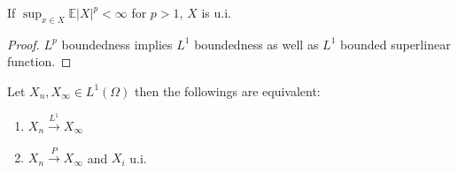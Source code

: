 \begin{corollary}
	If  $\sup_{x \in X} \mathbb{E}|X|^p < \infty$ for $p > 1$, $X$ is u.i.
\end{corollary}
\begin{proof}
	$L^p$ boundedness implies $L^1$ boundedness as well as $L^1$ bounded superlinear function.
\end{proof}

\begin{theorem}[Vitalli]
Let $X_n, X_\infty \in L^1(\Omega)$ then the followings are equivalent:
\begin{enumerate}
	\item $X_n \overset{L^1}{\rightarrow} X_\infty$
	\item $X_n \overset{P}{\rightarrow} X_\infty$ and $X_i$ u.i.
\end{enumerate}
\end{theorem}
